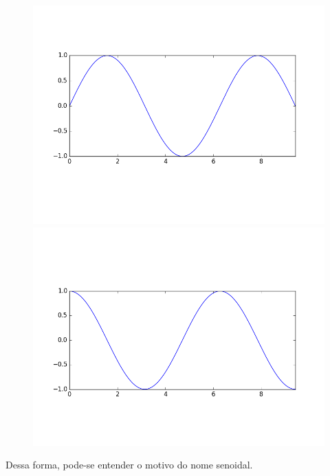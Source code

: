 		\begin{figure}[H]
			\centering
			\begin{minipage}{.5\textwidth}
				\centering
				\includegraphics[scale=.35]{resultsCodigos/seno3}
			\end{minipage}%
			\begin{minipage}{.5\textwidth}
				\centering
				\includegraphics[scale=.35]{resultsCodigos/cosseno}
			\end{minipage}
		\end{figure}
		
		Dessa forma, pode-se entender o motivo do nome senoidal.
		
